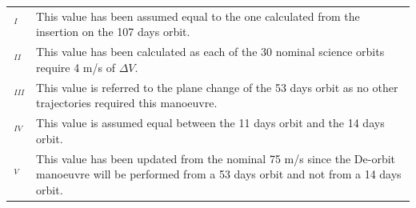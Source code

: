 {
\small
\renewcommand{\arraystretch}{1.1}
\begin{tabularx}{\linewidth}{lX}
    $\,^{I}$ & This value has been assumed equal to the one calculated from the insertion on the 107 days orbit. 
    \\
    $\,^{II}$ & This value has been calculated as each of the 30 nominal science orbits require 4 m/s of $\Delta V$.
    \\
    $\,^{III}$ & This value is referred to the plane change of the 53 days orbit as no other trajectories required this manoeuvre. 
    \\
    $\,^{IV}$ & This value is assumed equal between the 11 days orbit and the 14 days orbit.
    \\
    $\,^{V}$ & This value has been updated from the nominal 75 m/s since the De-orbit manoeuvre will be performed from a 53 days orbit and not from a 14 days orbit.
\end{tabularx}
}